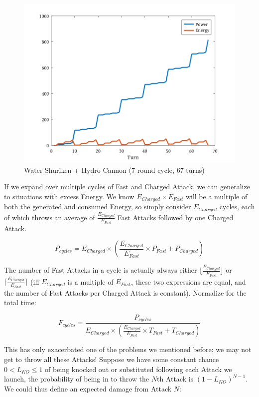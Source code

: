 \begin{figure}[ht]
  \centering
  \includegraphics[width=\textwidth]{octave/greninja.png}
  \caption[Damage cycle]{Water Shuriken + Hydro Cannon (7 round cycle, 67 turns)}
\end{figure}

If we expand over multiple cycles of Fast and Charged Attack, we can
 generalize to situations with excess Energy. We know $E_{Charged} \times
 E_{Fast}$ will be a multiple of both the generated and consumed Energy, so
 simply consider $E_{Charged}$ cycles, each of which throws an average of
 $\frac{E_{Charged}}{E_{Fast}}$ Fast Attacks followed by one Charged Attack.

\[ P_{cycles} = E_{Charged} \times \left(\frac{E_{Charged}}{E_{Fast}} \times P_{Fast} + P_{Charged}\right) \]

 The number of Fast Attacks in a cycle is actually always either
 $\lfloor\frac{E_{Charged}}{E_{Fast}}\rfloor$
 or $\lceil\frac{E_{Charged}}{E_{Fast}}\rceil$ (iff $E_{Charged}$ is a multiple of
 $E_{Fast}$, these two expressions are equal, and the number of Fast Attacks
 per Charged Attack is constant). Normalize for the total time:

\[ F_{cycles} = \frac{P_{cycles}}{E_{Charged} \times \left(\frac{E_{Charged}}{E_{Fast}} \times T_{Fast} + T_{Charged}\right)} \]

This has only exacerbated one of the problems we mentioned before: we may
  not get to throw all these Attacks!
Suppose we have some constant chance $0 < L_{KO} \leq 1$ of being knocked out or
 substituted following each Attack we launch, the probability of being
 in to throw the $N$th Attack is $(1 - L_{KO})^{N-1}$.
We could thus define an expected damage from Attack $N$:

